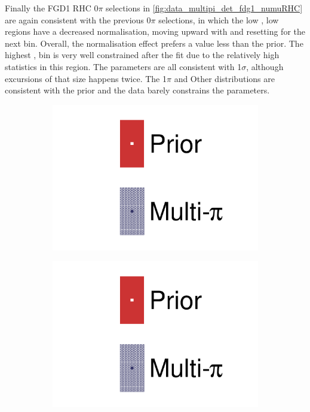 Finally the FGD1 \numu RHC 0$\pi$ selections in \autoref{fig:data_multipi_det_fdg1_numuRHC} are again consistent with the previous 0$\pi$ selections, in which the low \cosmu, low \pmu regions have a decreased normalisation, moving upward with \pmu and resetting for the next \cosmu bin. Overall, the normalisation effect prefers a value less than the prior. The highest \cosmu, \pmu bin is very well constrained after the fit due to the relatively high statistics in this region. The parameters are all consistent with 1$\sigma$, although excursions of that size happens twice. The 1$\pi$ and Other distributions are consistent with the prior and the data barely constrains the parameters.
\begin{figure}[h]
	\centering
	\begin{subfigure}[t]{0.1\textwidth}
		\includegraphics[width=\textwidth,page=1, trim={0mm 120mm 40mm 20mm}, clip]{figures/mach3/2018/data/2018a_FixedCov_RedCov_Mpi_Data_merge_drawPar_withDet}
	\end{subfigure}
	\begin{subfigure}[t]{0.1\textwidth}
		\includegraphics[width=\textwidth,page=1, trim={0mm 20mm 40mm 120mm}, clip]{figures/mach3/2018/data/2018a_FixedCov_RedCov_Mpi_Data_merge_drawPar_withDet}
	\end{subfigure}


\end{figure}
